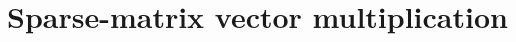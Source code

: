 

\section{Sparse-matrix vector multiplication}
\label{sec:smvm}

\newcommand\spyplot[1]{\parbox[c][1.1cm][c]{1.1cm}{\texttt{[image: images/results/smvm/\#1]}}}

